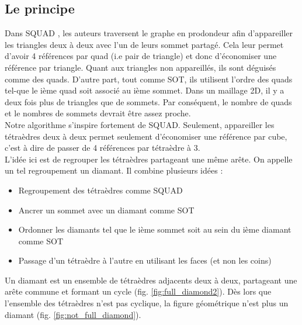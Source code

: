 \documentclass[a4paper,11pt,openany]{article}
\begin{document}
\subsection{Le principe}
\noindent
Dans SQUAD \cite{squad}, les auteurs traversent le graphe en prodondeur afin d'appareiller les triangles deux à deux avec l'un de leurs sommet partagé. Cela leur permet d'avoir 4 références par quad (i.e pair de triangle) et donc d'économiser une référence par triangle. Quant aux triangles non appareillés, ils sont déguisés comme des quads. D'autre part, tout comme SOT, ils utilisent l'ordre des quads tel-que le ième quad soit associé au ième sommet. Dans un maillage 2D, il y a deux fois plus de triangles que de sommets. Par conséquent, le nombre de quads et le nombres de sommets devrait être assez proche.\\
Notre algorithme s'inspire fortement de SQUAD. Seulement, appareiller les tétraèdres deux à deux permet seulement d'économiser une référence par cube, c'est à dire de passer de 4 références par tétraèdre à 3.\\
L'idée ici est de regrouper les tétraèdres partageant une même arête. On appelle un tel regroupement un diamant. Il combine plusieurs idées :
\begin{itemize}
\item Regroupement des tétraèdres comme SQUAD
\item Ancrer un sommet avec un diamant comme SOT
\item Ordonner les diamants tel que le ième sommet soit au sein du ième diamant comme SOT
\item Passage d'un tétraèdre à l'autre en utilisant les faces (et non les coins)
\end{itemize}
Un diamant est un ensemble de tétraèdres adjacents deux à deux, partageant une arête commune et formant un cycle (fig. \ref{fig:full_diamond2}). Dès lors que l'ensemble des tétraèdres n'est pas cyclique, la figure géométrique n'est plus un diamant (fig. \ref{fig:not_full_diamond}). 
\end{document}
